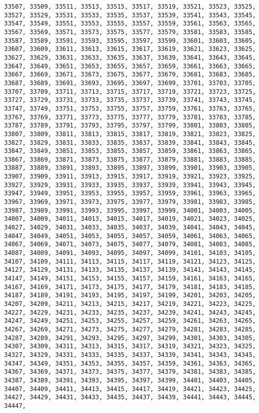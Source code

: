 \documentclass[11pt]{article}
\begin{document}
\begin{Verbatim}[commandchars=\\\{\}]
33507, 33509, 33511, 33513, 33515, 33517, 33519, 33521, 33523, 33525, 33527, 33529, 33531, 33533, 33535, 33537, 33539, 33541, 33543, 33545, 33547, 33549, 33551, 33553, 33555, 33557, 33559, 33561, 33563, 33565, 33567, 33569, 33571, 33573, 33575, 33577, 33579, 33581, 33583, 33585, 33587, 33589, 33591, 33593, 33595, 33597, 33599, 33601, 33603, 33605, 33607, 33609, 33611, 33613, 33615, 33617, 33619, 33621, 33623, 33625, 33627, 33629, 33631, 33633, 33635, 33637, 33639, 33641, 33643, 33645, 33647, 33649, 33651, 33653, 33655, 33657, 33659, 33661, 33663, 33665, 33667, 33669, 33671, 33673, 33675, 33677, 33679, 33681, 33683, 33685, 33687, 33689, 33691, 33693, 33695, 33697, 33699, 33701, 33703, 33705, 33707, 33709, 33711, 33713, 33715, 33717, 33719, 33721, 33723, 33725, 33727, 33729, 33731, 33733, 33735, 33737, 33739, 33741, 33743, 33745, 33747, 33749, 33751, 33753, 33755, 33757, 33759, 33761, 33763, 33765, 33767, 33769, 33771, 33773, 33775, 33777, 33779, 33781, 33783, 33785, 33787, 33789, 33791, 33793, 33795, 33797, 33799, 33801, 33803, 33805, 33807, 33809, 33811, 33813, 33815, 33817, 33819, 33821, 33823, 33825, 33827, 33829, 33831, 33833, 33835, 33837, 33839, 33841, 33843, 33845, 33847, 33849, 33851, 33853, 33855, 33857, 33859, 33861, 33863, 33865, 33867, 33869, 33871, 33873, 33875, 33877, 33879, 33881, 33883, 33885, 33887, 33889, 33891, 33893, 33895, 33897, 33899, 33901, 33903, 33905, 33907, 33909, 33911, 33913, 33915, 33917, 33919, 33921, 33923, 33925, 33927, 33929, 33931, 33933, 33935, 33937, 33939, 33941, 33943, 33945, 33947, 33949, 33951, 33953, 33955, 33957, 33959, 33961, 33963, 33965, 33967, 33969, 33971, 33973, 33975, 33977, 33979, 33981, 33983, 33985, 33987, 33989, 33991, 33993, 33995, 33997, 33999, 34001, 34003, 34005, 34007, 34009, 34011, 34013, 34015, 34017, 34019, 34021, 34023, 34025, 34027, 34029, 34031, 34033, 34035, 34037, 34039, 34041, 34043, 34045, 34047, 34049, 34051, 34053, 34055, 34057, 34059, 34061, 34063, 34065, 34067, 34069, 34071, 34073, 34075, 34077, 34079, 34081, 34083, 34085, 34087, 34089, 34091, 34093, 34095, 34097, 34099, 34101, 34103, 34105, 34107, 34109, 34111, 34113, 34115, 34117, 34119, 34121, 34123, 34125, 34127, 34129, 34131, 34133, 34135, 34137, 34139, 34141, 34143, 34145, 34147, 34149, 34151, 34153, 34155, 34157, 34159, 34161, 34163, 34165, 34167, 34169, 34171, 34173, 34175, 34177, 34179, 34181, 34183, 34185, 34187, 34189, 34191, 34193, 34195, 34197, 34199, 34201, 34203, 34205, 34207, 34209, 34211, 34213, 34215, 34217, 34219, 34221, 34223, 34225, 34227, 34229, 34231, 34233, 34235, 34237, 34239, 34241, 34243, 34245, 34247, 34249, 34251, 34253, 34255, 34257, 34259, 34261, 34263, 34265, 34267, 34269, 34271, 34273, 34275, 34277, 34279, 34281, 34283, 34285, 34287, 34289, 34291, 34293, 34295, 34297, 34299, 34301, 34303, 34305, 34307, 34309, 34311, 34313, 34315, 34317, 34319, 34321, 34323, 34325, 34327, 34329, 34331, 34333, 34335, 34337, 34339, 34341, 34343, 34345, 34347, 34349, 34351, 34353, 34355, 34357, 34359, 34361, 34363, 34365, 34367, 34369, 34371, 34373, 34375, 34377, 34379, 34381, 34383, 34385, 34387, 34389, 34391, 34393, 34395, 34397, 34399, 34401, 34403, 34405, 34407, 34409, 34411, 34413, 34415, 34417, 34419, 34421, 34423, 34425, 34427, 34429, 34431, 34433, 34435, 34437, 34439, 34441, 34443, 34445, 34447, 
\end{Verbatim}
\end{document}
